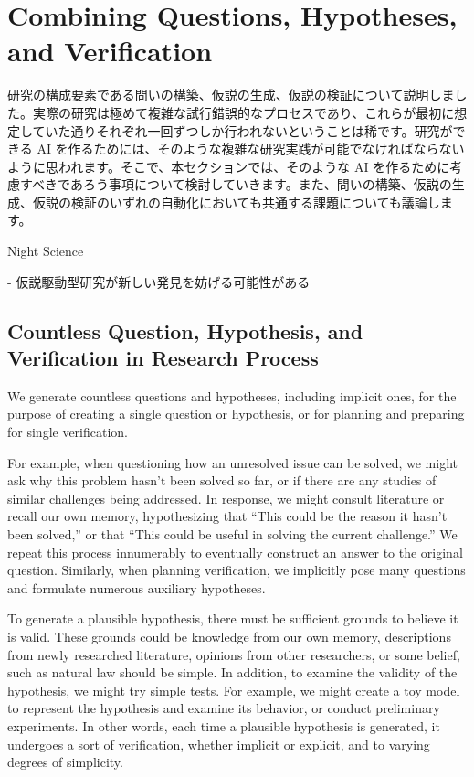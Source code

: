 \section{Combining Questions, Hypotheses, and Verification}

研究の構成要素である問いの構築、仮説の生成、仮説の検証について説明しました。実際の研究は極めて複雑な試行錯誤的なプロセスであり、これらが最初に想定していた通りそれぞれ一回ずつしか行われないということは稀です。研究ができる AI を作るためには、そのような複雑な研究実践が可能でなければならないように思われます。そこで、本セクションでは、そのような AI を作るために考慮すべきであろう事項について検討していきます。また、問いの構築、仮説の生成、仮説の検証のいずれの自動化においても共通する課題についても議論します。

Night Science

- 仮説駆動型研究が新しい発見を妨げる可能性がある \cite{yanai2020hypothesis}

\subsection{Countless Question, Hypothesis, and Verification in Research Process}
We generate countless questions and hypotheses, including implicit ones, for the purpose of creating a single question or hypothesis, or for planning and preparing for single verification.

For example, when questioning how an unresolved issue can be solved, we might ask why this problem hasn't been solved so far, or if there are any studies of similar challenges being addressed. In response, we might consult literature or recall our own memory, hypothesizing that ``This could be the reason it hasn't been solved,'' or that ``This could be useful in solving the current challenge.'' We repeat this process innumerably to eventually construct an answer to the original question. Similarly, when planning verification, we implicitly pose many questions and formulate numerous auxiliary hypotheses.

To generate a plausible hypothesis, there must be sufficient grounds to believe it is valid. These grounds could be knowledge from our own memory, descriptions from newly researched literature, opinions from other researchers, or some belief, such as natural law should be simple. In addition, to examine the validity of the hypothesis, we might try simple tests. For example, we might create a toy model to represent the hypothesis and examine its behavior, or conduct preliminary experiments. In other words, each time a plausible hypothesis is generated, it undergoes a sort of verification, whether implicit or explicit, and to varying degrees of simplicity.

